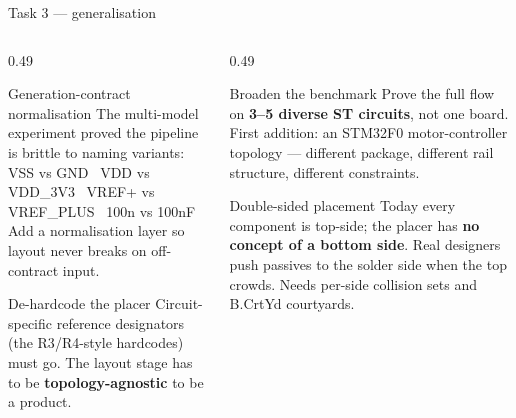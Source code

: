 \documentclass[aspectratio=169,10pt]{beamer}
\newcommand{\code}[1]{{\ttfamily\small #1}}
\begin{document}
\begin{frame}{Task 3 --- generalisation}
\vspace{1mm}
\begin{columns}[T]
\begin{column}{0.49\textwidth}
\begin{block}{Generation-contract normalisation}
\small
The multi-model experiment proved the pipeline is brittle to naming variants:\\[3pt]
\code{VSS} vs \code{GND} \textbullet\ \code{VDD} vs \code{VDD\_3V3} \textbullet\ \code{VREF+} vs \code{VREF\_PLUS} \textbullet\ \code{100n} vs \code{100nF}\\[3pt]
Add a normalisation layer so layout never breaks on off-contract input.
\end{block}
\vspace{1mm}
\begin{block}{De-hardcode the placer}
\small
Circuit-specific reference designators (the \code{R3}/\code{R4}-style hardcodes) must go. The layout stage has to be \textbf{topology-agnostic} to be a product.
\end{block}
\end{column}
\begin{column}{0.49\textwidth}
\begin{block}{Broaden the benchmark}
\small
Prove the full flow on \textbf{3--5 diverse ST circuits}, not one board. First addition: an STM32F0 motor-controller topology --- different package, different rail structure, different constraints.
\end{block}
\vspace{1mm}
\begin{block}{Double-sided placement}
\small
Today every component is top-side; the placer has \textbf{no concept of a bottom side}. Real designers push passives to the solder side when the top crowds. Needs per-side collision sets and \code{B.CrtYd} courtyards.
\end{block}
\end{column}
\end{columns}
\end{frame}
\end{document}
